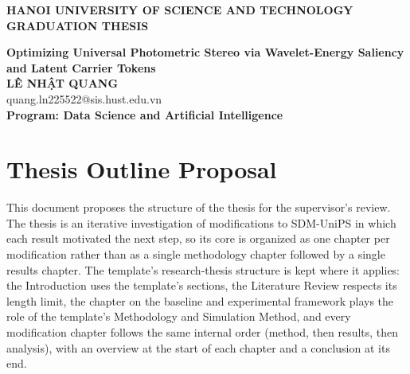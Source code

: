 \documentclass[Main.tex]{subfiles}
\begin{document}
\begin{titlepage}
\thispagestyle{empty}
\begin{center}

{\textbf{\large{HANOI UNIVERSITY OF SCIENCE AND TECHNOLOGY }}}\\[4cm]

{\textbf{\huge{GRADUATION THESIS}}}\\[1cm]
{\textbf{\Large{Optimizing Universal Photometric Stereo via Wavelet-Energy Saliency and Latent Carrier Tokens}}\\[1cm]

{\textbf{\large{LÊ NHẬT QUANG}}}\\
{\large{quang.ln225522@sis.hust.edu.vn}}\\[0.5cm]

{\textbf{\large{Program: Data Science and Artificial Intelligence}}}\\

\vspace{4cm}
\begin{table}[H]
\centering
{}
\end{table}}
\end{center}

\end{titlepage}

\chapter*{Thesis Outline Proposal}

This document proposes the structure of the thesis for the supervisor's review. The thesis is an
iterative investigation of modifications to SDM-UniPS in which each result motivated the next
step, so its core is organized as one chapter per modification rather than as a single
methodology chapter followed by a single results chapter. The template's research-thesis
structure is kept where it applies: the Introduction uses the template's sections, the Literature
Review respects its length limit, the chapter on the baseline and experimental framework plays
the role of the template's Methodology and Simulation Method, and every modification chapter
follows the same internal order (method, then results, then analysis), with an overview at the
start of each chapter and a conclusion at its end.
\end{document}
